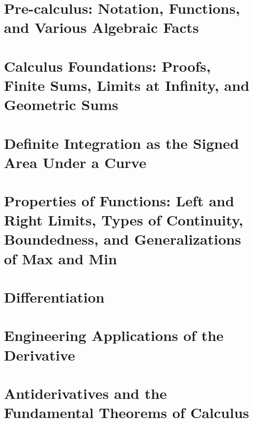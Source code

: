 \documentclass[letterpaper]{book}
\makeatletter
\renewcommand{\mainmatter}{\cleardoublepage\@mainmattertrue}
\makeatother
\begin{document}
\mainmatter
{} %

\setlength{\parskip}{3pt}

\chapter{Pre-calculus: Notation, Functions, and Various Algebraic Facts}
\label{chap:Intro}


\chapter{Calculus Foundations: Proofs, Finite Sums, Limits at Infinity, and Geometric Sums}
\label{chap:Foundations}


\chapter{Definite Integration as the Signed Area Under a Curve}
\label{chap:DefiniteIntegration}


\chapter{Properties of Functions:  Left and Right Limits, Types of Continuity, Boundedness, and Generalizations of Max and Min}
\label{chap:FunctionProperties}
                                                                    
\chapter{Differentiation}
\label{chap:Differentiation}


\chapter{Engineering Applications of the Derivative}
\label{chap:ApplicationsDifferentiation}


\chapter{Antiderivatives and the Fundamental Theorems of Calculus}
\label{chap:AntiDerivFundThmCalc}

\end{document}
